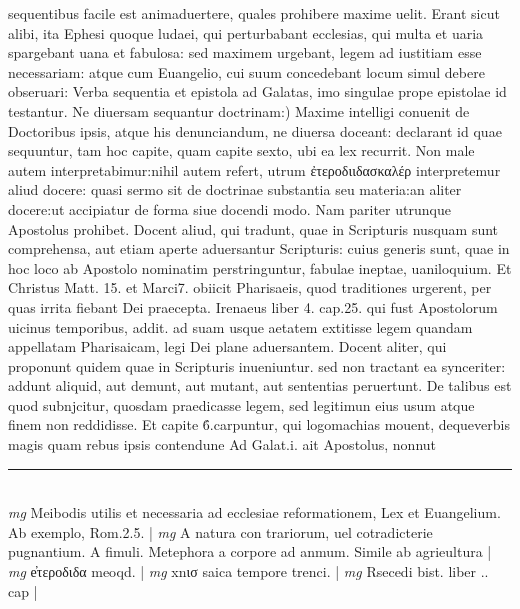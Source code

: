 \documentclass{article}
\begin{document}
\begin{pages}
sequentibus facile est animaduertere, quales prohibere maxime uelit. Erant sicut alibi, ita Ephesi quoque  ludaei, qui perturbabant ecclesias, qui multa et uaria spargebant uana et fabulosa: sed maximem urgebant, legem ad iustitiam esse necessariam: atque  cum Euangelio, cui suum concedebant locum simul debere obseruari: Verba sequentia et epistola ad Galatas, imo singulae prope epistolae id testantur.  \pend\pstart Ne diuersam sequantur doctrinam:) Maxime intelligi conuenit de Doctoribus ipsis, atque  his denunciandum, ne diuersa doceant: declarant id quae sequuntur, tam hoc capite, quam capite sexto, ubi ea lex recurrit. Non male autem interpretabimur:nihil autem refert, utrum ἐτεροδιιδασκαλέρ interpretemur aliud docere: quasi sermo sit de doctrinae substantia seu materia:an aliter docere:ut accipiatur de forma siue docendi modo. Nam pariter utrunque  Apostolus prohibet. Docent aliud, qui tradunt, quae in Scripturis nusquam sunt comprehensa, aut etiam aperte aduersantur Scripturis: cuius generis sunt, quae in hoc loco ab Apostolo nominatim perstringuntur, fabulae ineptae, uaniloquium. Et Christus Matt. 15. et Marci7. obiicit Pharisaeis, quod traditiones urgerent, per quas irrita fiebant Dei praecepta. Irenaeus liber 4. cap.25. qui fust Apostolorum uicinus temporibus, addit. ad suam usque  aetatem extitisse legem quandam appellatam Pharisaicam, legi Dei plane aduersantem. Docent aliter, qui proponunt quidem quae in Scripturis inueniuntur. sed non tractant ea synceriter: addunt aliquid, aut demunt, aut mutant, aut sententias peruertunt. De talibus est quod subnjcitur, quosdam praedicasse legem, sed legitimun eius usum atque  finem non reddidisse. Et capite 6́.carpuntur, qui logomachias mouent, dequeverbis magis quam rebus ipsis contendune Ad Galat.i. ait Apostolus, nonnut  \pend
\vspace{0.5cm}\noindent
\vspace{0.2cm}\rule{1cm}{0.2pt}\\ 
\hspace{0.2cm}\textit{mg}
\footnotesize Meibodis utilis et necessaria ad ecclesiae reformationem, Lex et Euangelium. Ab exemplo, Rom.2.5. 
\normalsize| 
\hspace{0.2cm}\textit{mg}
\footnotesize A natura con trariorum, uel cotradicterie pugnantium. A fimuli. Metephora a corpore ad anmum. Simile ab agrieultura 
\normalsize| 
\hspace{0.2cm}\textit{mg}
\footnotesize e̓τεροδιδα meoqd. 
\normalsize| 
\hspace{0.2cm}\textit{mg}
\footnotesize xnισ saica tempore trenci. 
\normalsize| 
\hspace{0.2cm}\textit{mg}
\footnotesize Rsecedi bist. liber .. cap
\normalsize| 

\end{pages}
\end{document}
